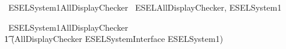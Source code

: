 \begin{zsection}
	\SECTION\ ESELSystem1AllDisplayChecker \parents\ ESELAllDisplayChecker, ESELSystem1
\end{zsection}

\begin{circus}
    \circprocess\ ESELSystem1AllDisplayChecker \circdef \\
        \t1 (AllDisplayChecker \lpar ESELSystemInterface \rpar ESELSystem1) \\
\end{circus}
